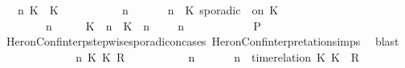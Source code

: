 \begin{isabellebody}
\ \ {\isasymGamma}\ n\ K\ {\isasymtau}\ K\ {\isasymPsi}\ {\isasymPhi}\isanewline
\ \ \ \ \ \ \isamarkupfalse%
\ {\isacartoucheopen}{\isacharparenleft}{\isasymGamma}\ n\ {\isasymturnstile}\ {\isasymPsi}\ {\isasymtriangleright}\ {\isasymPhi}\ {\isacharequal}\ {\isacharparenleft}{\isasymGamma}{\isacharcomma}\ n\ {\isasymturnstile}\ {\isacharparenleft}K\ sporadic\ {\isasymtau}\ on\ K\ {\isacharhash}\ {\isasymPsi}\ {\isasymtriangleright}\ {\isasymPhi}{\isacharparenright}{\isacartoucheclose}\isanewline
\ \ \ \ \ \ \ {\isacartoucheopen}{\isacharparenleft}{\isasymGamma}\ n\ {\isasymturnstile}\ {\isasymPsi}\ {\isasymtriangleright}\ {\isasymPhi}\ {\isacharequal}\ {\isacharparenleft}{\isacharparenleft}{\isacharparenleft}K\ {\isasymUp}\ n{\isacharparenright}\ {\isacharhash}\ {\isacharparenleft}K\ {\isasymDown}\ n\ {\isacharat}\ {\isasymtau}{\isacharparenright}\ {\isacharhash}\ {\isasymGamma}{\isacharparenright}{\isacharcomma}\ n\ {\isasymturnstile}\ {\isasymPsi}\ {\isasymtriangleright}\ {\isasymPhi}{\isacharparenright}{\isacartoucheclose}\isanewline
\ \ \ \ \ \ \isamarkupfalse%
\ {\isacharquery}P\isanewline
\ \ \ \ \ \ \ \ \isamarkupfalse%
\ HeronConf{\isacharunderscore}interp{\isacharunderscore}stepwise{\isacharunderscore}sporadicon{\isacharunderscore}cases\ HeronConf{\isacharunderscore}interpretation{\isachardot}simps\ \isamarkupfalse%
\ blast\isanewline
\ \ \ \ \isamarkupfalse%
\isanewline
\ \ \ \ \ \ \isamarkupfalse%
\ {\isasymGamma}\ n\ K\ K\ R\ {\isasymPsi}\ {\isasymPhi}\isanewline
\ \ \ \ \ \ \isamarkupfalse%
\ {\isacartoucheopen}{\isacharparenleft}{\isasymGamma}\ n\ {\isasymturnstile}\ {\isasymPsi}\ {\isasymtriangleright}\ {\isasymPhi}\ {\isacharequal}\ {\isacharparenleft}{\isasymGamma}{\isacharcomma}\ n\ {\isasymturnstile}\ {\isacharparenleft}time{\isacharminus}relation\ {\isasymlfloor}K\ K\ {\isasymin}\ R{\isacharparenright}\ {\isacharhash}\ {\isasymPsi}\ {\isasymtriangleright}\ {\isasymPhi}{\isacharparenright}{\isacartoucheclose}\isanewline

\end{isabellebody}
